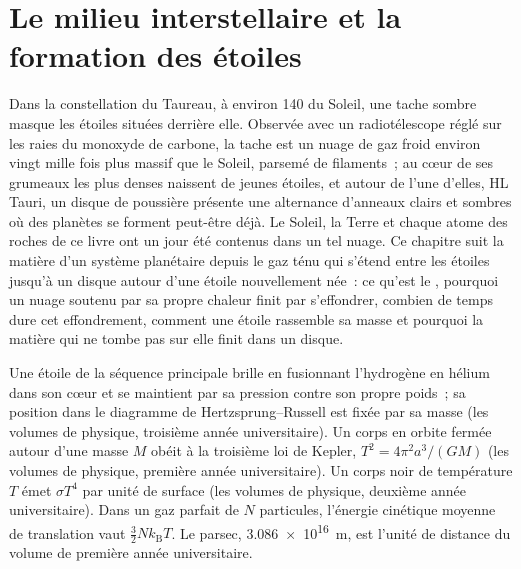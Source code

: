 \chapter{Le milieu interstellaire et la formation des étoiles}\label{ch:b2:ism-star-formation}

Dans la constellation du Taureau, à environ \qty{140}{\parsec} du Soleil, une tache sombre
masque les étoiles situées derrière elle. Observée avec un radiotélescope réglé sur les raies du monoxyde de carbone, la tache est un nuage de gaz froid environ vingt mille fois plus
massif que le Soleil, parsemé de filaments~; au cœur de ses grumeaux les plus denses naissent de jeunes étoiles, et autour de l'une d'elles, HL Tauri, un disque de poussière présente une alternance d'anneaux clairs et sombres où des planètes se forment peut-être déjà.
Le Soleil, la Terre et chaque atome des roches de ce livre ont un jour été contenus dans un tel nuage. Ce chapitre suit la matière d'un système planétaire depuis le gaz ténu qui s'étend entre les étoiles jusqu'à un disque autour d'une étoile nouvellement née~: ce qu'est le , pourquoi un nuage soutenu par sa propre chaleur finit par s'effondrer,
combien de temps dure cet effondrement, comment une étoile rassemble sa masse et pourquoi la matière qui ne tombe
pas
sur
elle
finit
dans
un
disque.

\begin{recall}
Une étoile de la séquence principale brille en fusionnant l'hydrogène en hélium dans son cœur
et se maintient par sa pression contre son propre poids~; sa position dans le diagramme de Hertzsprung--Russell est fixée par sa masse (les volumes de physique, troisième année
universitaire). Un corps en orbite fermée autour d'une masse $M$ obéit à la troisième loi de Kepler, $T^2 = 4\pi^2 a^3/(GM)$ (les volumes de physique, première année universitaire). Un corps noir de température $T$ émet $\sigma T^4$ par unité de surface (les volumes de
physique, deuxième année universitaire). Dans un gaz parfait de $N$ particules, l'énergie cinétique moyenne de translation vaut $\tfrac32 N k_{\mathrm B} T$. Le parsec, \qty{3.086e16}{m}, est l'unité de distance du
volume
de
première
année
universitaire.
\end{recall}

